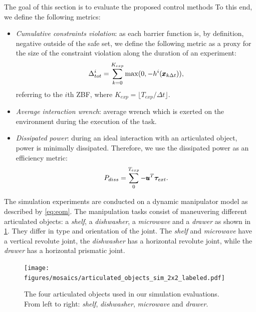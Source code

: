 The goal of this section is to evaluate the proposed control methods  To this end, we define the following metrics:
\begin{itemize}
    \item \textit{Cumulative constraints violation}: as each barrier function is, by definition, negative outside of the safe set, we define the following metric as a proxy for the size of the constraint violation along the duration of an experiment:
    \begin{equation*}
        \Delta^{i}_{tot} = \sum\limits_{k=0}^{K_{exp}} \max(0, -h^i(\pmb{x}_{k \Delta t})),
    \end{equation*}
    referring to the $i$th ZBF, where $K_{exp} = \lfloor T_{exp} / \Delta t \rfloor$.
    \item \textit{Average interaction wrench}: average wrench which is exerted on the environment during the execution of the task.
    \item \textit{Dissipated power}: during an ideal interaction with an articulated object, power is minimally dissipated. Therefore, we use the dissipated power as an efficiency metric:
    \begin{equation}
        P_{diss} = \sum\limits_{0}^{T_{exp}} -\pmb{u}^T \boldsymbol{\tau}_{ext}.
    \end{equation}
\end{itemize}
The simulation experiments are conducted on a dynamic manipulator model as described by \eqref{eq:eom}. The manipulation tasks consist of maneuvering different articulated objects: a \textit{shelf}, a \textit{dishwasher}, a \textit{microwave} and a \textit{drawer} as shown in \fig\ref{fig:object_manipulation}. They differ in type and orientation of the joint. The \textit{shelf} and \textit{microwave} have a vertical revolute joint, the \textit{dishwasher} has a horizontal revolute joint, while the \textit{drawer} has a horizontal prismatic joint.
  
\begin{figure}[t]
\centering
  \texttt{[image: figures/mosaics/articulated\_objects\_sim\_2x2\_labeled.pdf]}
  \caption{The four articulated objects used in our simulation evaluations. From left to right: \textit{shelf}, \textit{dishwasher}, \textit{microwave} and \textit{drawer}. } \label{fig:object_manipulation}
\end{figure}



